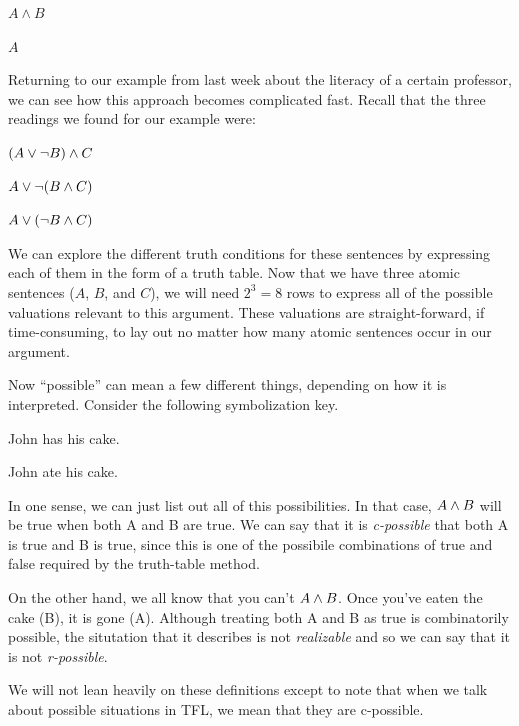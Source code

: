 \begin{argument}
  \item[\ephi:] $A \wedge B$
  \item[\epsi:] $A$
\end{argument}

Returning to our example from last week about the literacy of a certain
professor, we can see how this approach becomes complicated fast. Recall that
the three readings we found for our example were:

\begin{argument}
  \item[\ephi:] $(A \vee \neg B) \wedge C$
  \item[\epsi:] $A \vee \neg (B \wedge C)$
  \item[\echi:] $A \vee (\neg B \wedge C)$
\end{argument}

We can explore the different truth conditions for these sentences by expressing
each of them in the form of a truth table. Now that we have three atomic
sentences ($A$, $B$, and $C$), we will need $2^3 = 8$ rows to express all of
the possible valuations relevant to this argument. These valuations are
straight-forward, if time-consuming, to lay out no matter how many atomic
sentences occur in our argument.

Now ``possible'' can mean a few different things, depending on how it is
interpreted. Consider the following symbolization key.

\begin{argument}
\item[A:] John has his cake.
\item[B:] John ate his cake.
\end{argument}

In one sense, we can just list out all of this possibilities. In that case,
$A \wedge B$ will be true when both A and B are true. We can say that it is
\emph{c-possible} that both A is true and B is true, since this is one of the
possibile combinations of true and false required by the truth-table method.

On the other hand, we all know that you can't $A \wedge B$. Once you've eaten
the cake (B), it is gone (\enot A). Although treating both A and B as true is
combinatorily possible, the situtation that it describes is not
\emph{realizable} and so we can say that it is not \emph{r-possible}.

We will not lean heavily on these definitions except to note that when we talk
about possible situations in TFL, we mean that they are c-possible.

